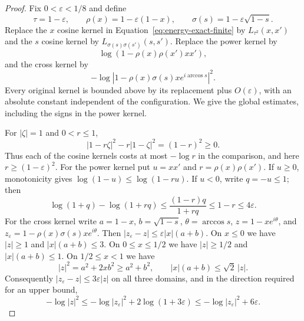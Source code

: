 \begin{proof}
Fix $0<\varepsilon<1/8$ and define
\begin{equation}\label{eq:energy-damping}
 \tau=1-\varepsilon,\qquad
 \rho(x)=1-\varepsilon(1-x),\qquad
 \sigma(s)=1-\varepsilon\sqrt{1-s}.
\end{equation}
Replace the $x$ cosine kernel in Equation~\eqref{eq:energy-exact-finite}
by $L_{\tau^2}(x,x')$ and the $s$ cosine kernel by
$L_{\sigma(s)\sigma(s')}(s,s')$.  Replace the power kernel by
\[
 \log(1-\rho(x)\rho(x')xx'),
\]
and the cross kernel by
\[
 -\log|1-\rho(x)\sigma(s)xe^{i\arccos s}|^2.
\]
Every original kernel is bounded above by its replacement plus
$O(\varepsilon)$, with an absolute constant independent of the configuration.
We give the global estimates, including the signs in the power kernel.

For $|\zeta|=1$ and $0<r\le1$,
\[
 |1-r\zeta|^2-r|1-\zeta|^2=(1-r)^2\ge0.
\]
Thus each of the cosine kernels costs at most $-\log r$ in the
comparison, and here $r\ge(1-\varepsilon)^2$.  For the power kernel put
$u=xx'$ and $r=\rho(x)\rho(x')$.  If $u\ge0$, monotonicity gives
$\log(1-u)\le\log(1-ru)$.  If $u<0$, write $q=-u\le1$; then
\begin{equation}\label{eq:energy-opposite-sign}
 \log(1+q)-\log(1+rq)
 \le\frac{(1-r)q}{1+rq}\le1-r\le4\varepsilon.
\end{equation}
For the cross kernel write
$a=1-x$, $b=\sqrt{1-s}$, $\theta=\arccos s$,
$z=1-xe^{i\theta}$, and $z_\varepsilon=1-\rho(x)\sigma(s)xe^{i\theta}$.
Then
$|z_\varepsilon-z|\le\varepsilon|x|(a+b)$.
On $x\le0$ we have $|z|\ge1$ and $|x|(a+b)\le3$.
On $0\le x\le1/2$ we have $|z|\ge1/2$ and
$|x|(a+b)\le1$.  On $1/2\le x<1$ we have
\[
 |z|^2=a^2+2xb^2\ge a^2+b^2,
 \qquad |x|(a+b)\le\sqrt2\,|z|.
\]
Consequently $|z_\varepsilon-z|\le3\varepsilon|z|$ on all three domains,
and in the direction required for an upper bound,
\begin{equation}\label{eq:energy-cross-comparison}
 -\log|z|^2\le-\log|z_\varepsilon|^2
                +2\log(1+3\varepsilon)
 \le-\log|z_\varepsilon|^2+6\varepsilon.
\end{equation}


\end{proof}
